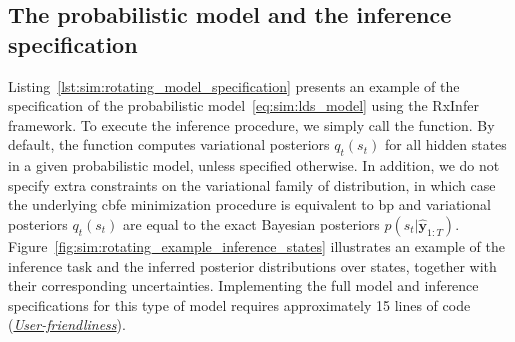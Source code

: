 \subsection{The probabilistic model and the inference specification}

\begin{figure*}
  \begin{adjustbox}{minipage=\textwidth,margin=0pt \smallskipamount,center}
  \end{adjustbox}
\end{figure*}

Listing~\ref{lst:sim:rotating_model_specification} presents an example of the specification of the probabilistic model~\eqref{eq:sim:lds_model} using the RxInfer framework.
To execute the inference procedure, we simply call the  function.
By default, the  function computes variational posteriors $q_t(s_t)$ for all hidden states in a given probabilistic model, unless specified otherwise. 
In addition, we do not specify extra constraints on the variational family of distribution, in which case the underlying \ac{cbfe} minimization procedure is equivalent to \ac{bp} and variational posteriors $q_t(s_t)$ are equal to the exact Bayesian posteriors $p(s_t\vert\hat{\bm{y}}_{1:T})$.
Figure~\ref{fig:sim:rotating_example_inference_states} illustrates an example of the inference
task and the inferred posterior distributions over states, together with their corresponding
uncertainties.
Implementing the full model and inference specifications for this type of model requires
approximately 15 lines of code (\hyperlink{experiments:userfriendliness}{\emph{User-friendliness}}). 

\begin{figure*}
  \begin{adjustbox}{minipage=\textwidth,margin=0pt \smallskipamount,center}
  \end{adjustbox}
\end{figure*}

